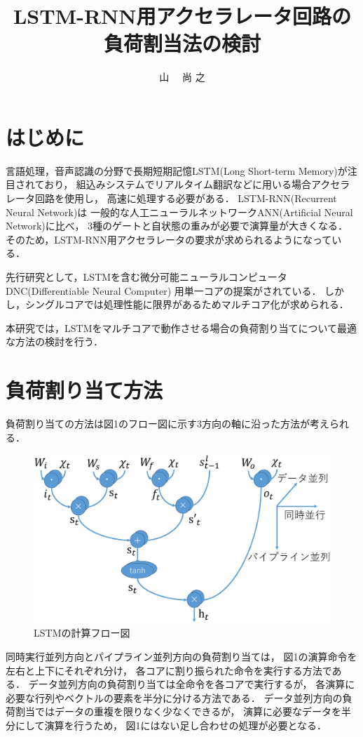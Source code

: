 \documentclass[a4j]{jarticle}
\title{LSTM-RNN用アクセラレータ回路の負荷割当法の検討}
\author{山 \UTF{FA11} ~~尚 之}
\begin{document}
\begin{Abstract}

 \section{はじめに}

言語処理，音声認識の分野で長期短期記憶LSTM(Long Short-term Memory)が注目されており，
組込みシステムでリアルタイム翻訳などに用いる場合アクセラレータ回路を使用し，
高速に処理する必要がある．
LSTM-RNN(Recurrent Neural Network)は
一般的な人工ニューラルネットワークANN(Artificial Neural Network)に比べ，
3種のゲートと自状態の重みが必要で演算量が大きくなる．
そのため，LSTM-RNN用アクセラレータの要求が求められるようになっている．

先行研究として，LSTMを含む微分可能ニューラルコンピュータDNC(Differentiable Neural Computer)
用単一コアの提案がされている\cite{bib:pre-method}．
しかし，シングルコアでは処理性能に限界があるためマルチコア化が求められる．

本研究では，LSTMをマルチコアで動作させる場合の負荷割り当てについて最適な方法の検討を行う．



 \section{負荷割り当て方法}
 負荷割り当ての方法は図1のフロー図に示す3方向の軸に沿った方法が考えられる．
 \begin{figure}[h]
  \centering
  \includegraphics[scale=0.25]{flow.eps}
  \caption{LSTMの計算フロー図}
 \end{figure}


同時実行並列方向とパイプライン並列方向の負荷割り当ては，
図1の演算命令を左右と上下にそれぞれ分け，
各コアに割り振られた命令を実行する方法である．
データ並列方向の負荷割り当ては全命令を各コアで実行するが，
各演算に必要な行列やベクトルの要素を半分に分ける方法である．
データ並列方向の負荷割当ではデータの重複を限りなく少なくできるが，
演算に必要なデータを半分にして演算を行うため，
図1にはない足し合わせの処理が必要となる．



\end{Abstract}
\end{document}
